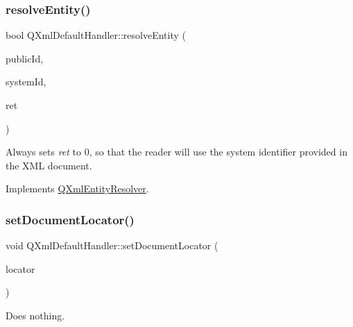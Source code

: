 \mbox{\label{class_q_xml_default_handler_ac2fa1a7aff599d2832fca1d650a435a7}} 
\subsubsection{\texorpdfstring{resolveEntity()}{resolveEntity()}}
{\footnotesize\ttfamily bool Q\+Xml\+Default\+Handler\+::resolve\+Entity (\begin{DoxyParamCaption}\item[{const \mbox{\hyperlink{class_q_string}{Q\+String}} \&}]{public\+Id,  }\item[{const \mbox{\hyperlink{class_q_string}{Q\+String}} \&}]{system\+Id,  }\item[{\mbox{\hyperlink{class_q_xml_input_source}{Q\+Xml\+Input\+Source}} $\ast$\&}]{ret }\end{DoxyParamCaption})\hspace{0.3cm}{\ttfamily [virtual]}}

Always sets {\itshape ret} to 0, so that the reader will use the system identifier provided in the X\+ML document. 

Implements \mbox{\hyperlink{class_q_xml_entity_resolver_a4b0b6141c016eb3f7e37361f4ce13966}{Q\+Xml\+Entity\+Resolver}}.

\mbox{\label{class_q_xml_default_handler_add9860b32800232e14f6d4150ed23937}} 
\subsubsection{\texorpdfstring{setDocumentLocator()}{setDocumentLocator()}}
{\footnotesize\ttfamily void Q\+Xml\+Default\+Handler\+::set\+Document\+Locator (\begin{DoxyParamCaption}\item[{\mbox{\hyperlink{class_q_xml_locator}{Q\+Xml\+Locator}} $\ast$}]{locator }\end{DoxyParamCaption})\hspace{0.3cm}{\ttfamily [virtual]}}

Does nothing. 

